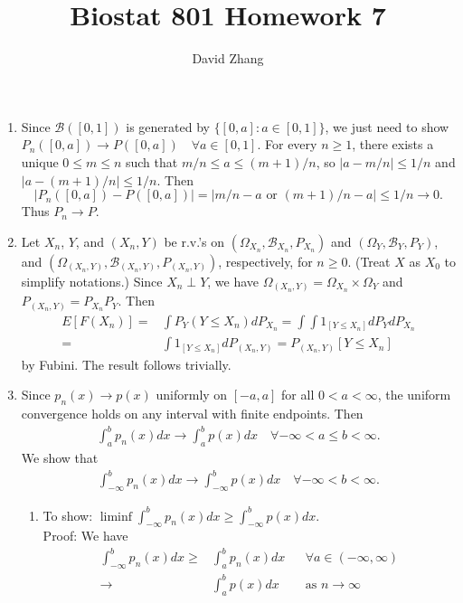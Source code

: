 \documentclass{article}
\title{Biostat 801 Homework 7}
\author{David Zhang}
\newcommand{\B}{\mathcal{B}}
\begin{document}
\maketitle


\begin{enumerate}


\item Since $\B([0,1])$ is generated by $\{[0, a]: a \in [0,1]\}$,
  we just need to show $P_n([0,a]) \to P([0,a]) \quad \forall a \in [0,1]$.
  For every $n \geq 1$, there exists a unique $0 \leq m \leq n$ such that $m/n \leq a \leq (m+1)/n$,
  so $|a - m/n| \leq 1/n$ and $|a - (m+1)/n| \leq 1/n$.
  Then
  \[
    |P_n([0,a]) - P([0,a])| = |m/n - a \text{ or } (m+1)/n - a| \leq 1/n \to 0.
  \]
  Thus $P_n \to P$.
\item Let $X_n$, $Y$, and $(X_n,Y)$ be r.v.'s on $(\Omega_{X_n}, \B_{X_n}, P_{X_n})$ and $(\Omega_Y, \B_Y, P_Y)$, and $(\Omega_{(X_n,Y)}, \B_{(X_n,Y)}, P_{(X_n,Y)})$, respectively, for $n \geq 0$.
  (Treat $X$ as $X_0$ to simplify notations.)
  Since $X_n \perp Y$,
  we have $\Omega_{(X_n, Y)} = \Omega_{X_n} \times \Omega_Y$ and $P_{(X_n,Y)} = P_{X_n} P_Y$.
  Then
  \begin{align*}
    E[ F(X_n) ]
    = & \int P_Y(Y \leq X_n) dP_{X_n}
    = \int \int 1_{[Y \leq X_n]} dP_Y dP_{X_n}
    \\ = & \int 1_{[Y \leq X_n]} dP_{(X_n,Y)}
           = P_{(X_n,Y)} [Y \leq X_n]
  \end{align*}
  by Fubini.
  The result follows trivially.
\item Since $p_n(x) \to p(x)$ uniformly on $[-a,a]$ for all $0 < a < \infty$,
  the uniform convergence holds on any interval with finite endpoints.
  Then
  \begin{align*}
    \int_{a}^b p_n(x) dx \to \int_{a}^b p(x) dx \quad \forall -\infty < a \leq b < \infty.
  \end{align*}
  We show that 
  \begin{align*}
    \int_{-\infty}^b p_n(x) dx \to \int_{-\infty}^b p(x) dx \quad \forall -\infty < b < \infty.
  \end{align*}
  \begin{enumerate}
  \item To show: $\liminf \int_{-\infty}^b p_n(x) dx \geq \int_{-\infty}^b p(x) dx$. \\
    Proof: We have
    \begin{align*}
      \int_{-\infty}^b p_n(x) dx 
      \geq & \int_{a}^b p_n(x) dx && \forall a \in (-\infty, \infty)
      \\ \to & \int_{a}^b p(x) dx && \text{as } n \to \infty

\end{align*}
\end{enumerate}
\end{enumerate}
\end{document}
